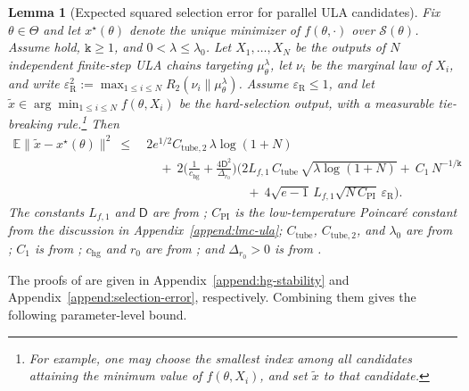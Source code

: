 \documentclass{article}
\theoremstyle{normaltheorem}
\newtheorem{lemma}[lemma]{Lemma}
\newcommand{\gibbs}{\mu}
\newcommand{\dimk}{\texttt{k}}
\newcommand{\calS}{\mathcal{S}}
\begin{document}
\begin{lemma}[Expected squared selection error for parallel ULA candidates]\label{thm:selection-error-bound}
Fix \(\theta\in\Theta\) and let \(x^\star(\theta)\) denote the unique minimizer of \(f(\theta,\cdot)\) over
\(\calS(\theta)\). Assume  hold, \(\dimk\ge1\), and
\(0<\lambda\le\lambda_0\). Let \(X_1,\dots,X_N\) be the outputs of \(N\) independent finite-step ULA chains targeting
\(\gibbs_\theta^\lambda\), let \(\nu_i\) be the marginal law of \(X_i\), and write
\(\varepsilon_{\mathrm R}^2:=\max_{1\le i\le N}R_2(\nu_i\|\gibbs_\theta^\lambda)\). Assume
\(\varepsilon_{\mathrm R}\le1\), and let \(\tilde x\in\arg\min_{1\le i\le N}f(\theta,X_i)\) be the hard-selection output,
with a measurable tie-breaking rule.\footnote{For example, one may choose the smallest index among all candidates attaining
the minimum value of \(f(\theta,X_i)\), and set \(\tilde x\) to that candidate.} Then
\begin{align}
\mathbb E\|\tilde x-x^\star(\theta)\|^2
\ \le\ &
2e^{1/2}C_{\mathrm{tube},2}\,\lambda\log(1+N)\nonumber\\
&\quad
+\ 2\Bigg(\frac{1}{c_{\mathrm{hg}}}+\frac{4\mathsf D^2}{\Delta_{r_0}}\Bigg)
\Bigg(
2L_{f,1}\,C_{\mathrm{tube}}\,\sqrt{\lambda\log(1+N)}
+\ C_1\,N^{-1/\dimk}
\nonumber\\
&\qquad\qquad\qquad\qquad
+\ 4\sqrt{e-1}\,L_{f,1}\sqrt{N\,C_{\mathrm{PI}}}\,\varepsilon_{\mathrm R}
\Bigg).
\label{eq:final-Ex2-bound}
\end{align}
The constants \(L_{f,1}\) and \(\mathsf D\) are from ;
\(C_{\mathrm{PI}}\) is the low-temperature Poincar\'e constant from the discussion in Appendix~\ref{append:lmc-ula};
\(C_{\mathrm{tube}}\), \(C_{\mathrm{tube},2}\), and \(\lambda_0\) are from
; \(C_1\) is from ;
\(c_{\mathrm{hg}}\) and \(r_0\) are from ; and \(\Delta_{r_0}>0\) is from
.
\end{lemma}

The proofs of  are given in
Appendix~\ref{append:hg-stability} and Appendix~\ref{append:selection-error}, respectively. Combining them gives the
following parameter-level bound.
\end{document}

